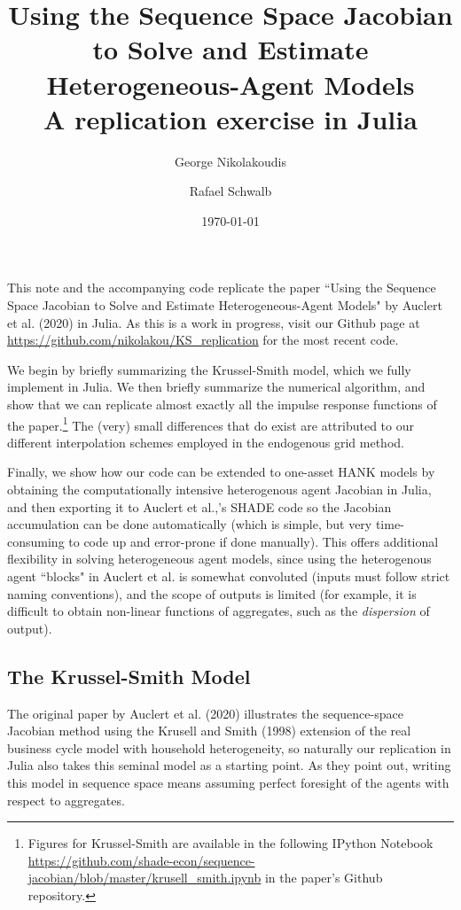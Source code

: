 \documentclass[10pt]{article} %
\title{Using the Sequence Space Jacobian to Solve and Estimate Heterogeneous-Agent Models \\
\vspace{1em} \large A replication exercise in Julia}
\author{George Nikolakoudis \and Rafael Schwalb}
\date{\today} %
\begin{document}
\maketitle
\nocite{*}

This note and the accompanying code replicate the paper ``Using the Sequence Space Jacobian to Solve and Estimate Heterogeneous-Agent Models" by Auclert et al. (2020) in Julia. As this is a work in progress, visit our Github page at \url{https://github.com/nikolakou/KS_replication} for the most recent code.

We begin by briefly summarizing the Krussel-Smith model, which we fully implement in Julia. We then briefly summarize the numerical algorithm, and show that we can replicate almost exactly all the impulse response functions of the paper.\footnote{Figures for Krussel-Smith are available in the following IPython Notebook \url{https://github.com/shade-econ/sequence-jacobian/blob/master/krusell_smith.ipynb} in the paper's Github repository.} The (very) small differences that do exist are attributed to our different interpolation schemes employed in the endogenous grid method.

Finally, we show how our code can be extended to one-asset HANK models by obtaining the computationally intensive heterogenous agent Jacobian in Julia, and then exporting it to Auclert et al.,'s SHADE code so the Jacobian accumulation can be done automatically (which is simple, but very time-consuming to code up and error-prone if done manually). This offers additional flexibility in solving heterogeneous agent models, since using the heterogenous agent ``blocks" in Auclert et al. is somewhat convoluted (inputs must follow strict naming conventions), and the scope of outputs is limited (for example, it is difficult to obtain non-linear functions of aggregates, such as the \emph{dispersion} of output).

\subsection*{The Krussel-Smith Model}


The original paper by Auclert et al. (2020) illustrates the sequence-space Jacobian method using the Krusell and Smith (1998) extension of the real business cycle model with household heterogeneity, so naturally our replication in Julia also takes this seminal model as a starting point. As they point out, writing this model in sequence space means assuming perfect foresight of the agents with respect to aggregates. %
\end{document}
